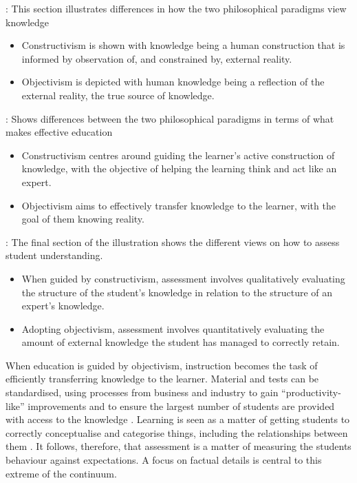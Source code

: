 \begin{description}
	\item[Epistemology]: This section illustrates differences in how the two philosophical paradigms view knowledge
	\begin{itemize}[noitemsep,nolistsep]
		\item Constructivism is shown with knowledge being a human construction that is informed by observation of, and constrained by, external reality.
		\item Objectivism is depicted with human knowledge being a reflection of the external reality, the true source of knowledge.
	\end{itemize}
	\item[Education]: Shows differences between the two philosophical paradigms in terms of what makes effective education
	\begin{itemize}[noitemsep,nolistsep]
		\item Constructivism centres around guiding the learner's active construction of knowledge, with the objective of helping the learning think and act like an expert.
		\item Objectivism aims to effectively transfer knowledge to the learner, with the goal of them knowing reality.
	\end{itemize}
	\item[Assessment]: The final section of the illustration shows the different views on how to assess student understanding.
	\begin{itemize}[noitemsep,nolistsep]
		\item When guided by constructivism, assessment involves qualitatively evaluating the structure of the student's knowledge in relation to the structure of an expert's knowledge.  
		\item Adopting objectivism, assessment involves quantitatively evaluating the amount of external knowledge the student has managed to correctly retain.
	\end{itemize}
\end{description}

When education is guided by objectivism, instruction becomes the task of efficiently transferring knowledge to the learner. Material and tests can be standardised, using processes from business and industry to gain ``productivity-like'' improvements and to ensure the largest number of students are provided with access to the knowledge \cite{Tyler:1969,Vrasidas:2000}. Learning is seen as a matter of getting students to correctly conceptualise and categorise things, including the relationships between them \cite{Lakoff:1987}. It follows, therefore, that assessment is a matter of measuring the students behaviour against expectations. A focus on factual details is central to this extreme of the continuum. 

